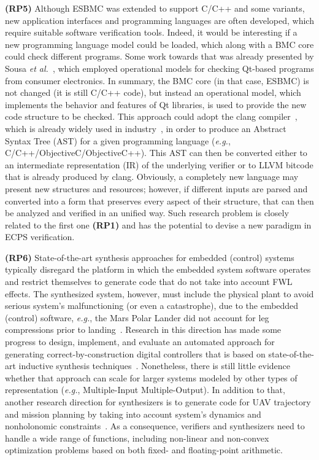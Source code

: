 \documentclass{cta-author}
\begin{document}
{\textbf{(RP5)} Although ESBMC \cite{Cordeiro12} was extended to support C/C++ and some variants, new application interfaces and programming languages are often developed, which require suitable software verification tools. Indeed, it would be interesting if a new programming language model could be loaded, which along with a BMC core could check different programs. Some work towards that was already presented by Sousa {\it et al.}~\cite{Garcia16}, which employed operational models for checking Qt-based programs from consumer electronics. In summary, the BMC core (in that case, ESBMC) is not changed (it is still C/C++ code), but instead an operational model, which implements the behavior and features of Qt libraries, is used to provide the new code structure to be checked. This approach could adopt the clang compiler~\cite{Lopes:2014:GSL:2692607}, which is already widely used in industry~\cite{clang-usage}, in order to produce an Abstract Syntax Tree (AST) for a given programming language ({\it e.g.}, C/C++/ObjectiveC/ObjectiveC++). This AST can then be converted either to an intermediate representation (IR) of the underlying verifier or to LLVM bitcode that is already produced by clang. Obviously, a completely new language may present new structures and resources; however, if different inputs are parsed and converted into a form that preserves every aspect of their structure, that can then be analyzed and verified in an unified way. Such research problem is closely related to the first one \textbf{(RP1)} and has the potential to devise a new paradigm in ECPS verification.
	
	{\textbf{(RP6)} State-of-the-art synthesis approaches for embedded (control) systems typically disregard the platform in which the embedded system software operates and restrict themselves to generate code that do not take into account FWL effects. The synthesized system, however, must include the physical plant to avoid serious system's malfunctioning (or even a catastrophe), due to the embedded (control) software, {\it e.g.}, the Mars Polar Lander did not account for leg compressions prior to landing~\cite{Jackson16}. Research in this direction has made some progress to design, implement, and evaluate an automated approach for generating correct-by-construction digital controllers that is based on state-of-the-art inductive synthesis techniques~\cite{Abate17,abatecav2017}. Nonetheless, there is still little evidence whether that approach can scale for larger systems modeled by other types of representation ({\it e.g.}, Multiple-Input Multiple-Output). In addition to that, another research direction for synthesizers is to generate code for UAV trajectory and mission planning by taking into account system's dynamics and nonholonomic constraints~\cite{ARAUJO2017}. As a consequence, verifiers and synthesizers need to handle a wide range of functions, including non-linear and non-convex optimization problems based on both fixed- and floating-point arithmetic.
		
}}
\end{document}
